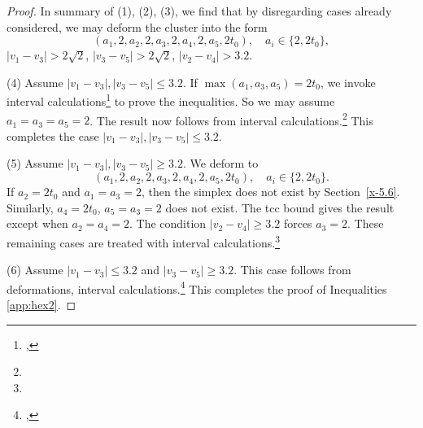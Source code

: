 \begin{proof}
In summary of (1), (2), (3), we find that by disregarding cases
already considered, we may deform the cluster into the form
    $$(a_1,2,a_2,2,a_3,2,a_4,2,a_5,2t_0),\quad a_i\in\{2,2t_0\},$$
$|v_1-v_3|>2\sqrt2$, $|v_3-v_5|>2\sqrt2$, $|v_2-v_4|>3.2.$

(4) Assume $|v_1-v_3|,|v_3-v_5|\le3.2$. If
$\max(a_1,a_3,a_5)=2t_0$, we invoke
 interval calculations\footnote{,} %
to prove the
inequalities.
 So we may assume $a_1=a_3=a_5=2$.  The result now follows from
interval calculations.\footnote{} %
This completes the case
$|v_1-v_3|,|v_3-v_5|\le3.2$.

(5) Assume $|v_1-v_3|,|v_3-v_5|\ge3.2$. We deform to
    $$(a_1,2,a_2,2,a_3,2,a_4,2,a_5,2t_0),\quad a_i\in\{2,2t_0\}.$$
If $a_2=2t_0$ and  $a_1=a_3=2$, then the simplex does not exist by
Section~\ref{x-5.6}.  %
Similarly, $a_4=2t_0$, $a_5=a_3=2$ does not exist. The tcc bound
gives the result except when $a_2=a_4=2$. The condition
$|v_2-v_4|\ge3.2$ forces $a_3=2$. These remaining cases are
treated with interval calculations.\footnote{} %

(6) Assume $|v_1-v_3|\le3.2$ and $|v_3-v_5|\ge3.2$. This case
follows from deformations, interval
calculations.\footnote{,} %
This completes the proof of Inequalities
\ref{app:hex2}.
\end{proof}

